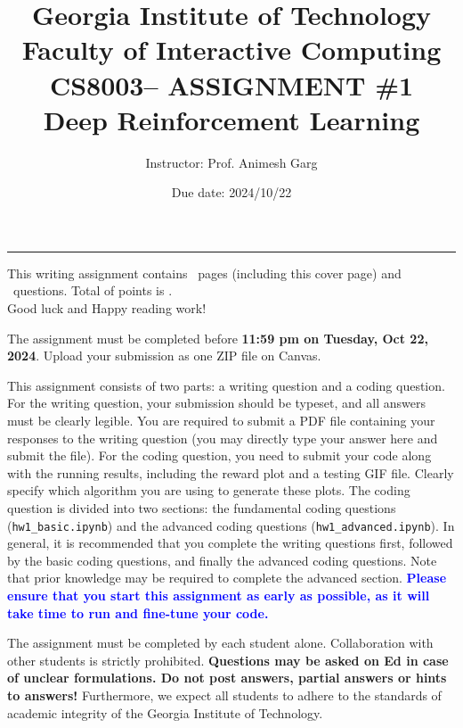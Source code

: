 \documentclass[letterpaper,12pt,addpoints]{exam}
\newcommand{\university}{Georgia Institute of Technology}
\newcommand{\faculty}{Faculty of Interactive Computing}
\newcommand{\class}{CS8003}
\newcommand{\examnum}{ASSIGNMENT \#1}
\newcommand{\content}{Deep Reinforcement Learning}
\newcommand{\examdate}{2024/10/22}
\begin{document}
\title{\Large \textbf{\university\\ \faculty\\
\bigskip
\class -- \examnum \\ \content}}
\author{Instructor: Prof. Animesh Garg}
\date{Due date: \examdate}

\maketitle
\begin{flushleft}
\medskip
{}
\end{flushleft}
\noindent \rule{\textwidth}{1pt}

\noindent This writing assignment contains \numpages\ pages (including this cover page) and \numquestions\ questions. Total of points is \numpoints.\\
Good luck and Happy reading work!

\vspace{15pt}

The assignment must be completed before \textbf{11:59 pm on Tuesday, Oct 22, 2024}. Upload your submission as one ZIP file on Canvas. 

This assignment consists of two parts: a writing question and a coding question. For the writing question, your submission should be typeset, and all answers must be clearly legible. You are required to submit a PDF file containing your responses to the writing question (you may directly type your answer here and submit the file). For the coding question, you need to submit your code along with the running results, including the reward plot and a testing GIF file. Clearly specify which algorithm you are using to generate these plots. The coding question is divided into two sections: the fundamental coding questions (\texttt{hw1\_basic.ipynb}) and the advanced coding questions (\texttt{hw1\_advanced.ipynb}). In general, it is recommended that you complete the writing questions first, followed by the basic coding questions, and finally the advanced coding questions. Note that prior knowledge may be required to complete the advanced section. \textbf{\textcolor{blue}{Please ensure that you start this assignment as early as possible, as it will take time to run and fine-tune your code.}}



The assignment must be completed by each student alone. Collaboration with other students is strictly prohibited. 
\textbf{
Questions may be asked on Ed in case of unclear formulations. Do not post answers, partial answers or hints to answers!} Furthermore, we expect all students to adhere to the standards of academic integrity of the Georgia Institute of Technology. 
\end{document}
